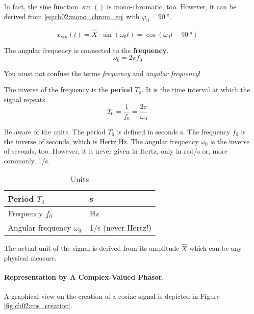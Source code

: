 \begin{refsection}
In fact, the sine function $\sin()$ is mono-chromatic, too. However, it can be derived from \eqref{eq:ch02:mono_chrom_eq} with $\varphi_0 = \SI{90}{\degree}$.

\begin{equation*}
	x_{sin}(t) = \hat{X} \cdot \sin\left(\omega_0 t\right) = \cos\left(\omega_0 t - \SI{90}{\degree}\right)
\end{equation*}

The angular frequency is connected to the  \textbf{frequency}.
\begin{equation}
	\omega_0 = 2 \pi f_0
\end{equation}

\begin{attention}
	You must not confuse the terms \emph{frequency} and \emph{angular frequency}!
\end{attention}

The inverse of the frequency is the  \textbf{period} $T_0$. It is the time interval at which the signal repeats.
\begin{equation}
	T_0 = \frac{1}{f_0} = \frac{2 \pi}{\omega_0}
\end{equation}

Be aware of the units. The period $T_0$ is defined in seconds \si{s}. The frequency $f_0$ is the inverse of seconds, which is Hertz \si{Hz}. The angular frequency $\omega_0$ is the inverse of seconds, too. However, it is never given in Hertz, only in \si{rad/s} or, more commonly, \si{1/s}.

\begin{table}[H]
	\centering
	\caption{Units}
	\begin{tabular}{|l|l|}
		\hline
		Period $T_0$ & \si{s} \\
		\hline
		Frequency $f_0$ & \si{Hz} \\
		\hline
		Angular frequency $\omega_0$ & \si{1/s} \; (never Hertz!) \\
		\hline
	\end{tabular}
\end{table}

The actual unit of the signal is derived from its amplitude $\hat{X}$ which can be any physical measure.

\paragraph{Representation by A Complex-Valued Phasor.}

A graphical view on the creation of a cosine signal is depicted in Figure \ref{fig:ch02:cos_creation}.


\end{refsection}
